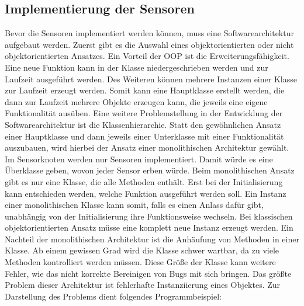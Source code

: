 \subsection{Implementierung der Sensoren}
Bevor die Sensoren implementiert werden können, muss eine Softwarearchitektur aufgebaut werden. Zuerst gibt es die Auswahl eines objektorientierten oder nicht objektorientierten Ansatzes.
Ein Vorteil der \ac{OOP} ist die Erweiterungsfähigkeit. Eine neue Funktion kann in der Klasse niedergeschrieben werden und zur Laufzeit ausgeführt werden. Des Weiteren können mehrere Instanzen einer Klasse zur Laufzeit erzeugt werden. Somit kann eine Hauptklasse erstellt werden, die dann zur Laufzeit mehrere Objekte erzeugen kann, die jeweils eine eigene Funktionalität ausüben. Eine weitere Problemstellung in der Entwicklung der Softwarearchitektur ist die Klassenhierarchie. Statt den gewöhnlichen Ansatz einer Hauptklasse und dann jeweils einer Unterklasse mit einer Funktionalität auszubauen, wird hierbei der Ansatz einer monolithischen Architektur gewählt. Im Sensorknoten werden nur Sensoren implementiert. Damit würde es eine Überklasse geben, wovon jeder Sensor erben würde. Beim monolithischen Ansatz gibt es nur eine Klasse, die alle Methoden enthält. Erst bei der Initialisierung kann entschieden werden, welche Funktion ausgeführt werden soll. Ein Instanz einer monolithischen Klasse kann somit, falls es einen Anlass dafür gibt, unabhängig von der Initialisierung ihre Funktionsweise wechseln. Bei klassischen objektorientierten Ansatz müsse eine komplett neue Instanz erzeugt werden. Ein Nachteil der monolithischen Architektur ist die Anhäufung von Methoden in einer Klasse. Ab einem gewissen Grad wird die Klasse schwer wartbar, da zu viele Methoden kontrolliert werden müssen. Diese Größe der Klasse kann weitere Fehler, wie das nicht korrekte Bereinigen von Bugs mit sich bringen. Das größte Problem dieser Architektur ist fehlerhafte Instanziierung eines Objektes. Zur Darstellung des Problems dient folgendes Programmbeispiel:

